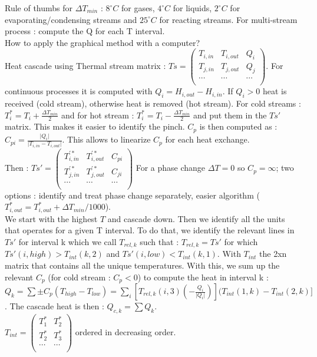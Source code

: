 \documentclass[../main.tex]{subfiles}
\begin{document}
Rule of thumbs for $\Delta T_{min}$ : $8^\circ C$ for gases, $4^\circ C$ for liquids, $2^\circ C$ for evaporating/condensing streams and $25^\circ C$ for reacting streams. For multi-stream process : compute the Q for each T interval. \\

How to apply the graphical method with a computer? \\
Heat cascade using Thermal stream matrix : $Ts = \begin{pmatrix}
        T_{i,in} & T_{i,out} & Q_i\\ T_{j,in} & T_{j,out} & Q_j \\ \cdots & \cdots & \cdots\\
    \end{pmatrix}$. For continuous processes it is computed with $Q_i = H_{i,out} - H_{i,in}$. If $Q_i>0$ heat is received (cold stream), otherwise heat is removed (hot stream). For cold streams : $T_i^* = T_i + \frac{\Delta T_{min}}{2}$ and for hot stream : $T_i^* = T_i - \frac{\Delta T_{min}}{2}$ and put them in the $Ts'$ matrix. This makes it easier to identify the pinch. $C_p$ is then computed as : $C_{pi} = \frac{\lvert Q_i \rvert}{\lvert T_{i,in}-T_{i,out} \rvert}$. This allows to linearize $C_p$ for each heat exchange.\\
Then : $Ts' = \begin{pmatrix}
    T_{i,in}^{'*} & T_{i,out}^{'*} & C_{pi}\\ 
    T_{j,in}^{'*} & T_{j,out}^{'*} & C_{ji}\\ 
    \cdots & \cdots & \cdots\\
\end{pmatrix}$
    \warning For a phase change $\Delta T =0$ so $C_p=\infty$; two options : identify and treat phase change separately, easier algorithm ($T_{i,out}^* = T_{i,out}^* + \Delta T_{min}/1000$).\\
We start with the highest $T$ and cascade down. Then we identify all the units that operates for a given T interval. To do that, we identify the relevant lines in $Ts'$ for interval k which we call $T_{rel,k}$ such that : $T_{rel,k} = Ts'$ for which $Ts'(i,high)>T_{int}(k,2)$ and $Ts'(i,low)< T_{int} (k,1)$. With $T_{int}$ the 2xn matrix that contains all the unique temperatures. With this, we sum up the relevant $C_p$ (for cold stream : $C_p<0$) to compute the heat in interval k : $Q_k = \sum \pm C_p (T_{high}-T_{low}) = \sum_i [T_{rel,k}(i,3) (-\frac{Q_i}{\lvert Q_i \rvert })] (T_{int}(1,k)-T_{int}(2,k)]$. The cascade heat is then : $Q_{c,k} = \sum Q_k$.\\
$T_{int} = \begin{pmatrix}
    T_1^* & T_2^*\\ T_2^* & T_3^*\\ \cdots & \cdots \\
\end{pmatrix}$ ordered in decreasing order.\\
\end{document}
